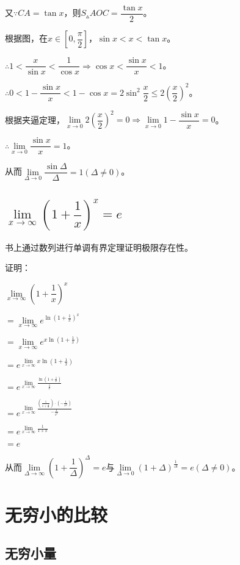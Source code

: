 \documentclass[UTF8, 12pt]{ctexart}
\begin{document}
又$\because CA=\tan x$，则$S_\vartriangle AOC=\dfrac{\tan x}{2}$。

根据图，在$x\in[0,\dfrac{\pi}{2}]$，$\sin x<x<\tan x$。

$\therefore 1<\dfrac{x}{\sin x}<\dfrac{1}{\cos x}\Rightarrow\cos x<\dfrac{\sin x}{x}<1$。

$\therefore 0<1-\dfrac{\sin x}{x}<1-\cos x=2\sin^2\dfrac{x}{2}\leqslant 2\left(\dfrac{x}{2}\right)^2$。

根据夹逼定理，$\lim\limits_{x\to 0}2\left(\dfrac{x}{2}\right)^2=0\Rightarrow\lim\limits_{x\to 0}1-\dfrac{\sin x}{x}=0$。

$\therefore\lim\limits_{x\to 0}\dfrac{\sin x}{x}=1$。

从而$\lim\limits_{\Delta\to 0}\dfrac{\sin\Delta}{\Delta}=1(\Delta\neq 0)$。

\subsection{\texorpdfstring{$\lim\limits_{x\to\infty}\left(1+\dfrac{1}{x}\right)^x=e$}{}}

书上通过数列进行单调有界定理证明极限存在性。

证明：

$\lim\limits_{x\to\infty}\left(1+\dfrac{1}{x}\right)^x$\medskip

$=\lim\limits_{x\to\infty}e^{\ln(1+\frac{1}{x})^x}$

$=\lim\limits_{x\to\infty}e^{x\ln(1+\frac{1}{x})}$

$=e^{\lim\limits_{x\to\infty}x\ln(1+\frac{1}{x})}$

$=e^{\lim\limits_{x\to\infty}\frac{\ln(1+\frac{1}{x})}{\frac{1}{x}}}$

$=e^{\lim\limits_{x\to\infty}\frac{\left(\frac{1}{1+\frac{1}{x}}\right)\cdot\left(-\frac{1}{x^2}\right)}{-\frac{1}{x^2}}}$

$=e^{\lim\limits_{x\to\infty}\frac{1}{1+x}}$

$=e$

从而$\lim\limits_{\Delta\to\infty}\left(1+\dfrac{1}{\Delta}\right)^\Delta=e$与$\lim\limits_{\Delta\to 0}\left(1+\Delta\right)^{\frac{1}{\Delta}}=e(\Delta\neq 0)$。

\section{无穷小的比较}

\subsection{无穷小量}
\end{document}
